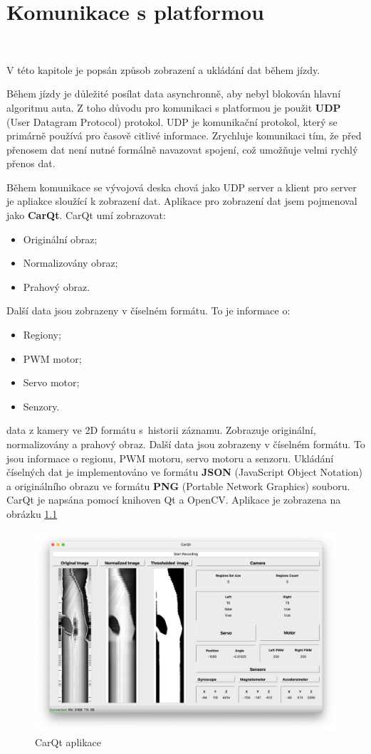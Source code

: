\chapter{Komunikace s platformou}
\label{sec:PlatformCommunication}
\vspace{-20pt}
\

V této kapitole je popsán způsob zobrazení a ukládání dat během jízdy.

Během jízdy je důležité posílat data asynchronně, aby nebyl  blokován hlavní algoritmu auta.
Z toho důvodu pro komunikaci s platformou je použit \textbf{UDP}
(User Datagram Protocol) protokol. UDP je komunikační protokol,
který se primárně používá pro časově citlivé informace.
Zrychluje komunikaci tím, že před přenosem dat není nutné formálně navazovat spojení, což umožňuje velmi rychlý přenos dat\cite{UDP}.

Během komunikace se vývojová deska chová jako UDP server a klient
pro server je apliakce sloužící k zobrazení dat. Aplikace pro zobrazení dat jsem pojmenoval jako \textbf{CarQt}. CarQt umí zobrazovat: 
\begin{itemize}
    \item Originální obraz;
    \item Normalizovány obraz;
    \item Prahový obraz.
\end{itemize}

Další data jsou zobrazeny v číselném formátu. To je informace o:
\begin{itemize}
    \item Regiony;
    \item PWM motor;
    \item Servo motor;
    \item Senzory.
\end{itemize}
data z kamery ve 2D formátu s~historii záznamu. Zobrazuje originální, normalizovány a prahový obraz. Další data
jsou zobrazeny v číselném formátu. To jsou informace o regionu, PWM motoru, servo motoru
a senzoru. Ukládání číselných dat je implementováno ve formátu \textbf{JSON}
(JavaScript Object Notation) a originálního obrazu ve formátu \textbf{PNG}
(Portable Network Graphics) souboru. CarQt je napsána pomocí knihoven Qt a OpenCV.
Aplikace je zobrazena na obrázku \ref{fig:CarQt}
\begin{figure}[!h]
    \centering
    \includegraphics[width = .5\linewidth]{Figures/CarQt.png}
    \caption{CarQt aplikace}
    \label{fig:CarQt}
\end{figure}


